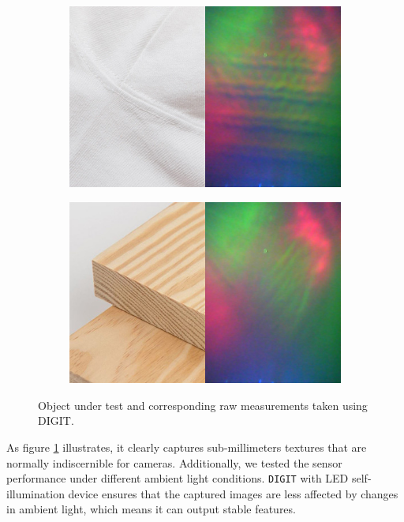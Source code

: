 \begin{figure}[t]
	\centering
	\begin{subfigure}[t]{0.4\textwidth}
		\includegraphics[width=1\textwidth]{fig/digit_cotton_shirt.jpg}
	\end{subfigure}
	\begin{subfigure}[t]{0.4\textwidth}
		\includegraphics[width=1\textwidth]{fig/digit_pine_wood.jpg}
	\end{subfigure}
\caption{Object under test and corresponding raw measurements taken using DIGIT.}
\label{fig:texture}
\end{figure}

As figure \ref{fig:texture} illustrates, it clearly captures sub-millimeters textures that are normally indiscernible for cameras. Additionally, we tested the sensor performance under different ambient light conditions. \texttt{DIGIT} with LED self-illumination device ensures that the captured images are less affected by changes in ambient light, which means it can output stable features. 


